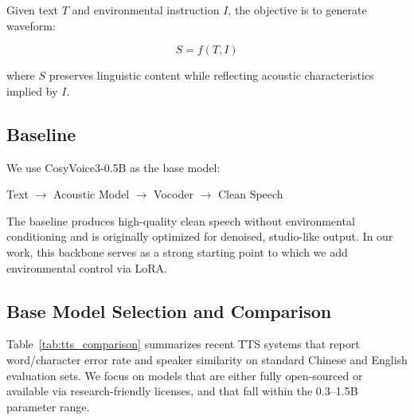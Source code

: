 \documentclass{article}
\begin{document}
Given text $T$ and environmental instruction $I$, the objective is to generate waveform:

\[
S = f(T, I)
\]

where $S$ preserves linguistic content while reflecting acoustic characteristics implied by $I$.

\subsection{Baseline}

We use CosyVoice3-0.5B as the base model:

\begin{center}
Text $\rightarrow$ Acoustic Model $\rightarrow$ Vocoder $\rightarrow$ Clean Speech
\end{center}

The baseline produces high-quality clean speech without environmental conditioning and is originally optimized for denoised, studio-like output. In our work, this backbone serves as a strong starting point to which we add environmental control via LoRA.

\subsection{Base Model Selection and Comparison}

Table~\ref{tab:tts_comparison} summarizes recent TTS systems that report word/character error rate and speaker similarity on standard Chinese and English evaluation sets. We focus on models that are either fully open-sourced or available via research-friendly licenses, and that fall within the 0.3--1.5B parameter range.
\end{document}
